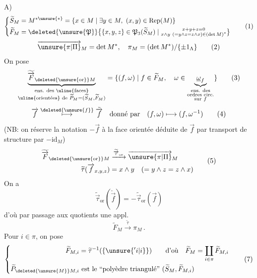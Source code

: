 A)
\[
 \left\{\begin{aligned}
 \widetilde S_M&=M^{*\unsure{*}}=\{x\in M\mid\exists y\in M,\ (x,y)\in\operatorname{Rep}(M)\}\\
 \widetilde F_M&=\deleted{\unsure{\mathfrak P}}\bigl\{\{x,y,z\}\in\mathfrak P_3(\widetilde S_M)\mid
 \substack{x+y+z=0\\x\wedge y\ (=y\wedge z=z\wedge x)\in(\det M)^*}\bigr\}
 \end{aligned}\right.\tag*{(1)}
\]
\[
 \overrightarrow{\unsure{\pi|\Pi}}_M=\det M^*,\quad \pi_M=(\det M^*)/\{\pm1_\Lambda\}\tag*{(2)}
\]
On pose
\[
 \underbrace{\widetilde{\overrightarrow F}_{\deleted{\unsure{\mathrm{or}}}M}}_{\substack{\text{ens. des \uline{faces}}\\\text{\uline{orientées} de }\widetilde P_M=(\widetilde S_M,\widetilde F_M)}}
 =\{(f,\omega)\mid f\in\widetilde F_M,\quad
 \omega\in\underbrace{\underline\omega_f}_{\substack{\text{ens. des}\\\text{ordres circ.}\\\text{sur }f}}\}\tag*{(3)}
\]
\[
 \overrightarrow f\overset{\deleted{\unsure{f}}}{\longmapsto}\check{\overrightarrow f}\quad
 \text{donné par}\quad(f,\omega)\longmapsto(f,\omega^{-1})\tag*{(4)}
\]
(NB: on  réserve la notation $-\overrightarrow f$ à la face orientée déduite de $\overrightarrow f$ par transport de structure par $-\mathrm{id}_M$)
\[
 \begin{aligned}
 \widetilde{\overrightarrow F}_{\deleted{\unsure{\mathrm{or}}}M}&\xrightarrow{\widetilde{\overrightarrow\tau}_{\mathrm{or}}}\overrightarrow{\unsure{\pi|\Pi}}_M\\
 \widetilde\tau(\overrightarrow f_{x,y,z})&=x\wedge y\quad(=y\wedge z=z\wedge x)
 \end{aligned}\tag*{(5)}
\]
On a
\[
 \widetilde{\overrightarrow\tau}_{\mathrm{or}}(\check{\overrightarrow f})=
 -\widetilde{\overrightarrow\tau}_{\mathrm{or}}(\overrightarrow f)
\]
d'où par passage aux quotients une appl.
\[
 \widetilde F_M\xrightarrow{\widetilde\tau}\pi_M\,.\tag*{(6)}
\]
Pour $i\in\pi$, on pose
\[
 \left\{\begin{aligned}
 \widetilde F_{M,i}&=\widetilde\tau^{-1}(\{\unsure{{}'i|i}\})\qquad\text{d'où}\quad\widetilde F_M=\coprod_{i\in\pi}\widetilde F_{M,i}\\
 \widetilde P_{\deleted{\unsure{M}}M,i}&\text{ est le ``polyèdre triangulé'' }(\widetilde S_M,\widetilde F_{M,i})
 \end{aligned}\right.\tag*{(7)}
\]
